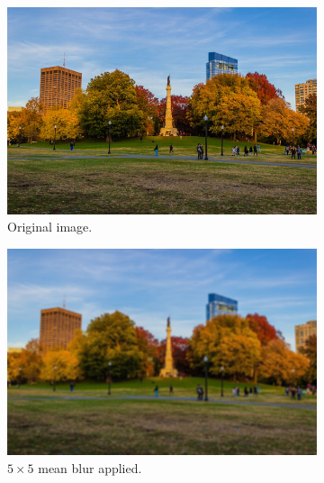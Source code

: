 \documentclass{article}
\begin{document}
\begin{example}
      \begin{figure}[H]
        \centering
        \begin{subfigure}[b]{0.32\textwidth}
        \centering
            \includegraphics[width=\textwidth]{img/OpenCV/Park_Full.png}
            \caption{Original image. }
            \label{fig:Park_Full}
        \end{subfigure}
        \begin{subfigure}[b]{0.32\textwidth}
        \centering
            \includegraphics[width=\textwidth]{img/OpenCV/Mean_Blur.png}
            \caption{$5 \times 5$ mean blur applied. }
            \label{fig:Mean_Blur}
        \end{subfigure}
        \begin{subfigure}[b]{0.32\textwidth}
        \centering

\end{subfigure}
\end{figure}
\end{example}
\end{document}
